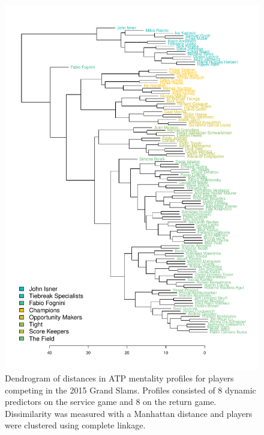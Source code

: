 \documentclass{Latex/svjour3}
\begin{document}
\begin{figure}
\includegraphics[scale=0.9]{figs/atp_dendro_std_fixed.pdf}
\caption{Dendrogram of distances in ATP mentality profiles for players competing
  in the 2015 Grand Slams. Profiles consisted of 8 dynamic predictors on the
  service game and 8 on the return game. Dissimilarity was measured with a
  Manhattan distance and players were clustered using complete linkage.}
\label{fig:atp_dendro}
\end{figure}

\clearpage
\end{document}

